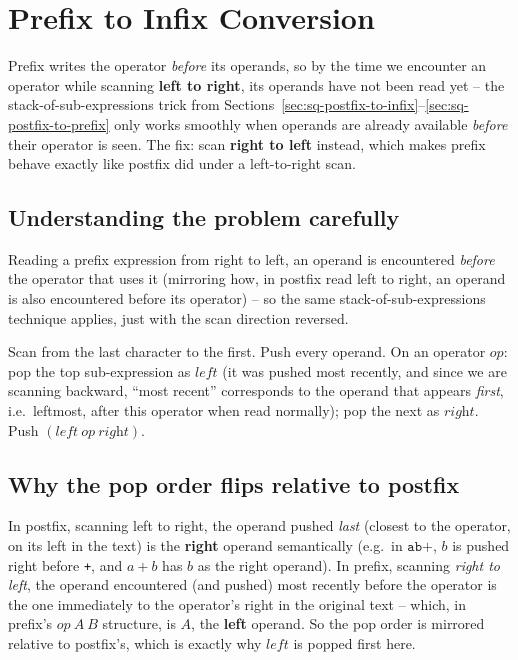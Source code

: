 \section{Prefix to Infix Conversion}
\label{sec:sq-prefix-to-infix}


\begin{patternbox}
Prefix writes the operator \emph{before} its operands, so by the time we
encounter an operator while scanning \textbf{left to right}, its operands
have not been read yet -- the stack-of-sub-expressions trick from
Sections~\ref{sec:sq-postfix-to-infix}--\ref{sec:sq-postfix-to-prefix}
only works smoothly when operands are already available \emph{before}
their operator is seen. The fix: scan \textbf{right to left} instead,
which makes prefix behave exactly like postfix did under a left-to-right
scan.
\end{patternbox}

\subsection*{Understanding the problem carefully}

Reading a prefix expression from right to left, an operand is encountered
\emph{before} the operator that uses it (mirroring how, in postfix read
left to right, an operand is also encountered before its operator) -- so
the same stack-of-sub-expressions technique applies, just with the scan
direction reversed.

\begin{ideabox}
Scan from the last character to the first. Push every operand. On an
operator $\textit{op}$: pop the top sub-expression as $\textit{left}$
(it was pushed most recently, and since we are scanning backward, ``most
recent'' corresponds to the operand that appears \emph{first}, i.e.\
leftmost, after this operator when read normally); pop the next as
$\textit{right}$. Push $(\textit{left}\ \textit{op}\ \textit{right})$.
\end{ideabox}

\subsection*{Why the pop order flips relative to postfix}

In postfix, scanning left to right, the operand pushed \emph{last}
(closest to the operator, on its left in the text) is the \textbf{right}
operand semantically (e.g.\ in $\texttt{ab+}$, $b$ is pushed right before
\texttt{+}, and $a+b$ has $b$ as the right operand). In prefix, scanning
\emph{right to left}, the operand encountered (and pushed) most recently
before the operator is the one immediately to the operator's right in the
original text -- which, in prefix's $\textit{op}\ A\ B$ structure, is $A$,
the \textbf{left} operand. So the pop order is mirrored relative to
postfix's, which is exactly why $\textit{left}$ is popped first here.

